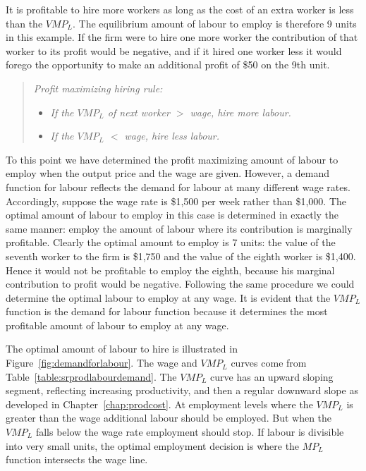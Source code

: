 It is profitable to hire more workers as long as the cost of an extra worker is less than the $VMP_L$. The equilibrium amount of labour to employ is therefore 9 units in this example. If the firm were to hire one more worker the contribution of that worker to its profit would be negative, and if it hired one worker less it would forego the opportunity to make an additional profit of \$50 on the 9th unit.

\begin{quote}
\textit{Profit maximizing hiring rule:}
\begin{itemize}
\item \textit{If the $VMP_L$ of next worker $>$ wage, hire more labour.}
\item \textit{If the $VMP_L$ $<$ wage, hire less labour.}
\end{itemize}
\end{quote}

To this point we have determined the profit maximizing amount of labour to employ when the output price and the wage are given. However, a demand function for labour reflects the demand for labour at many different wage rates. Accordingly, suppose the wage rate is \$1,500 per week rather than \$1,000. The optimal amount of labour to employ in this case is determined in exactly the same manner: employ the amount of labour where its contribution is marginally profitable. Clearly the optimal amount to employ is 7 units: the value of the seventh worker to the firm is \$1,750 and the value of the eighth worker is \$1,400. Hence it would not be profitable to employ the eighth, because his marginal contribution to profit would be negative. Following the same procedure we could determine the optimal labour to employ at any wage. It is evident that the $VMP_L$ function is the demand for labour function because it determines the most profitable amount of labour to employ at any wage.

The optimal amount of labour to hire is illustrated in Figure~\ref{fig:demandforlabour}. The wage and $VMP_L$ curves come from Table~\ref{table:srprodlabourdemand}. The $VMP_L$ curve has an upward sloping segment, reflecting increasing productivity, and then a regular downward slope as developed in Chapter~\ref{chap:prodcost}. At employment levels where the $VMP_L$ is greater than the wage additional labour should be employed. But when the $VMP_L$ falls below the wage rate employment should stop. If labour is divisible into very small units, the optimal employment decision is where the $MP_L$ function intersects the wage line.

